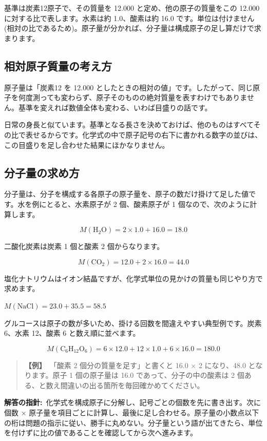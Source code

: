 \documentclass{article}
\begin{document}
基準は炭素12原子で、その質量を 12.000 と定め、他の原子の質量をこの 12.000 に対する比で表します。水素は約 1.0、酸素は約 16.0 です。単位は付けません(相対の比であるため)。原子量が分かれば、分子量は構成原子の足し算だけで求まります。

\subsection{相対原子質量の考え方}

原子量は「炭素12 を 12.000 としたときの相対の値」です。したがって、同じ原子を何度測っても変わらず、原子そのものの絶対質量を表すわけでもありません。基準を変えれば数値全体も変わる、いわば目盛りの話です。

日常の身長と似ています。基準となる長さを決めておけば、他のものはすべてその比で表せるからです。化学式の中で原子記号の右下に書かれる数字の並びは、この目盛りを足し合わせた結果にほかなりません。

\subsection{分子量の求め方}

分子量は、分子を構成する各原子の原子量を、原子の数だけ掛けて足した値です。水を例にとると、水素原子が 2 個、酸素原子が 1 個なので、次のように計算します。

\[ M(\mathrm{H}_{2}\mathrm{O}) = 2 \times 1.0 + 16.0 = 18.0 \]

二酸化炭素は炭素 1 個と酸素 2 個からなります。

\[ M(\mathrm{CO}_{2}) = 12.0 + 2 \times 16.0 = 44.0 \]

塩化ナトリウムはイオン結晶ですが、化学式単位の見かけの質量も同じやり方で求めます。

\( M(\mathrm{NaCl}) = 23.0 + 35.5 = 58.5 \)

グルコースは原子の数が多いため、掛ける回数を間違えやすい典型例です。炭素 6、水素 12、酸素 6 と数え順に並べます。

\[ M(\mathrm{C}_{6}\mathrm{H}_{12}\mathrm{O}_{6}) = 6 \times 12.0 + 12 \times 1.0 + 6 \times 16.0 = 180.0 \]

\begin{quote}
\textbf{【例】}\ 「酸素 2 個分の質量を足す」と書くと 16.0 × 2 になり、48.0 となります。原子 1 個の原子量は 16.0 であって、分子の中の酸素は 2 個ある、と数え間違いの出る箇所を毎回確かめてください。
\end{quote}

\textbf{解答の指針:}\ 化学式を構成原子に分解し、記号ごとの個数を先に書き出す。次に個数 × 原子量を項目ごとに計算し、最後に足し合わせる。原子量の小数点以下の桁は問題の指示に従い、勝手に丸めない。分子量という語が出てきたら、単位を付けずに比の値であることを確認してから次へ進みます。
\end{document}
